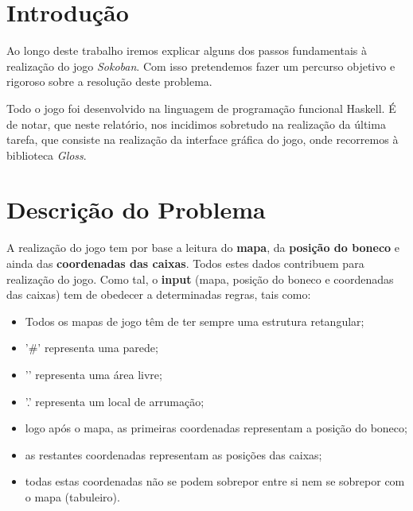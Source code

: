 \documentclass[12pt,a4paper]{report}
\begin{document}
\chapter{Introdução}
\label{sec:intro}


Ao longo deste trabalho iremos explicar alguns dos passos fundamentais à realização do jogo \emph{Sokoban}. Com isso pretendemos fazer um percurso objetivo e rigoroso sobre a resolução deste problema. 

Todo o jogo foi desenvolvido na linguagem de programação funcional Haskell. É de notar, que neste relatório, nos incidimos sobretudo na realização da última tarefa, que consiste na realização da interface gráfica do jogo, onde recorremos à biblioteca \emph{Gloss}.




\chapter{Descrição do Problema}
\label{sec:problema}

A realização do jogo tem por base a leitura do \textbf{mapa}, da \textbf{posição do boneco} e ainda das \textbf{coordenadas das caixas}. Todos estes dados contribuem para realização do jogo. Como tal, o \textbf{input} (mapa, posição do boneco e coordenadas das caixas) tem de obedecer a determinadas regras, tais como:

\begin{itemize}
  \item Todos os mapas de jogo têm de ter sempre uma estrutura retangular; 
  \item '\#' representa uma parede;
  \item '\space' representa uma área livre;
  \item '.' representa um local de arrumação;
  \item logo após o mapa, as primeiras coordenadas representam a posição do boneco;
  \item as restantes coordenadas representam as posições das caixas;
  \item todas estas coordenadas não se podem sobrepor entre si nem se sobrepor com o mapa (tabuleiro).
\end{itemize}
\end{document}
